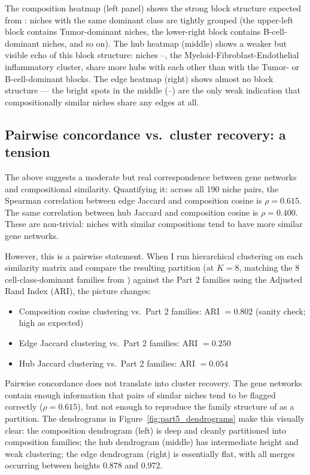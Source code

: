 The composition heatmap (left panel) shows the strong block structure expected from : niches with the same dominant class are tightly grouped (the upper-left block contains Tumor-dominant niches, the lower-right block contains B-cell-dominant niches, and so on). The hub heatmap (middle) shows a weaker but visible echo of this block structure: niches --, the Myeloid-Fibroblast-Endothelial inflammatory cluster, share more hubs with each other than with the Tumor- or B-cell-dominant blocks. The edge heatmap (right) shows almost no block structure --- the bright spots in the middle (--) are the only weak indication that compositionally similar niches share any edges at all.

\subsection*{Pairwise concordance vs.\ cluster recovery: a tension}

The above suggests a moderate but real correspondence between gene networks and compositional similarity. Quantifying it: across all 190 niche pairs, the Spearman correlation between edge Jaccard and composition cosine is $\rho = 0.615$. The same correlation between hub Jaccard and composition cosine is $\rho = 0.400$. These are non-trivial: niches with similar compositions tend to have more similar gene networks.

However, this is a pairwise statement. When I run hierarchical clustering on each similarity matrix and compare the resulting partition (at $K = 8$, matching the 8 cell-class-dominant families from ) against the Part 2 families using the Adjusted Rand Index (ARI), the picture changes:

\begin{itemize}
    \item Composition cosine clustering vs.\ Part 2 families: ARI $= 0.802$ (sanity check; high as expected)
    \item Edge Jaccard clustering vs.\ Part 2 families: ARI $= 0.250$
    \item Hub Jaccard clustering vs.\ Part 2 families: ARI $= 0.054$
\end{itemize}

Pairwise concordance does not translate into cluster recovery. The gene networks contain enough information that pairs of similar niches tend to be flagged correctly ($\rho = 0.615$), but not enough to reproduce the family structure of  as a partition. The dendrograms in Figure~\ref{fig:part5_dendrograms} make this visually clear: the composition dendrogram (left) is deep and cleanly partitioned into composition families; the hub dendrogram (middle) has intermediate height and weak clustering; the edge dendrogram (right) is essentially flat, with all merges occurring between heights $0.878$ and $0.972$.

